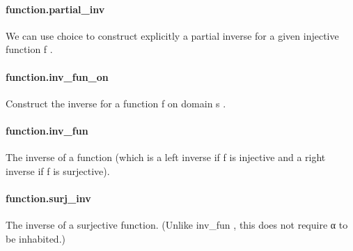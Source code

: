\documentclass{article}
\begin{document}
\paragraph{function.partial\_inv}
\par
We can use choice to construct explicitly a partial inverse for
a given injective function 
\colorbox[RGB]{253,246,227}{{{{\color[RGB]{101, 123, 131} f }}}}.
\paragraph{function.inv\_fun\_on}
\par
Construct the inverse for a function 
\colorbox[RGB]{253,246,227}{{{{\color[RGB]{101, 123, 131} f }}}} on domain 
\colorbox[RGB]{253,246,227}{{{{\color[RGB]{101, 123, 131} s }}}}.
\paragraph{function.inv\_fun}
\par
The inverse of a function (which is a left inverse if 
\colorbox[RGB]{253,246,227}{{{{\color[RGB]{101, 123, 131} f }}}} is injective
and a right inverse if 
\colorbox[RGB]{253,246,227}{{{{\color[RGB]{101, 123, 131} f }}}} is surjective).
\paragraph{function.surj\_inv}
\par
The inverse of a surjective function. (Unlike 
\colorbox[RGB]{253,246,227}{{{{\color[RGB]{101, 123, 131} inv\_fun }}}}, this does not require
\colorbox[RGB]{253,246,227}{{{{\color[RGB]{101, 123, 131} α }}}} to be inhabited.)
\end{document}
